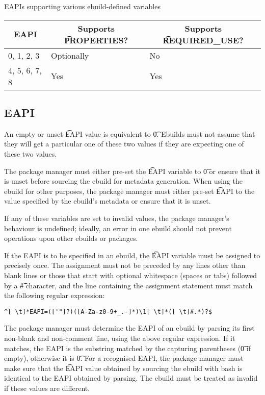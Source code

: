 \begin{centertable}{EAPIs supporting various ebuild-defined variables}
    \label{tab:optional-vars-table}
    \begin{tabular}{lll}
      \toprule
      \multicolumn{1}{c}{\textbf{EAPI}} &
      \multicolumn{1}{c}{\textbf{Supports \t{PROPERTIES}?}} &
      \multicolumn{1}{c}{\textbf{Supports \t{REQUIRED_USE}?}} \\
      \midrule
      0, 1, 2, 3        & Optionally & No  \\
      4, 5, 6, 7, 8     & Yes        & Yes \\
      \bottomrule
    \end{tabular}
\end{centertable}

\subsection{EAPI}
\label{sec:eapi}

An empty or unset \t{EAPI} value is equivalent to \t{0}. Ebuilds must not assume that they will get
a particular one of these two values if they are expecting one of these two values.

The package manager must either pre-set the \t{EAPI} variable to \t{0} or ensure that it is unset
before sourcing the ebuild for metadata generation. When using the ebuild for other purposes, the
package manager must either pre-set \t{EAPI} to the value specified by the ebuild's metadata or
ensure that it is unset.

If any of these variables are set to invalid values, the package manager's behaviour is undefined;
ideally, an error in one ebuild should not prevent operations upon other ebuilds or packages.

If the EAPI is to be specified in an ebuild, the \t{EAPI} variable must be assigned to precisely
once. The assignment must not be preceded by any lines other than blank lines or those that start
with optional whitespace (spaces or tabs) followed by a \t{\#} character, and the line containing
the assignment statement must match the following regular expression:
\begin{verbatim}
^[ \t]*EAPI=(['"]?)([A-Za-z0-9+_.-]*)\1[ \t]*([ \t]#.*)?$
\end{verbatim}

The package manager must determine the EAPI of an ebuild by parsing its first non-blank and
non-comment line, using the above regular expression. If it matches, the EAPI is the substring
matched by the capturing parentheses (\t{0} if empty), otherwise it is \t{0}. For a recognised
EAPI, the package manager must make sure that the \t{EAPI} value obtained by sourcing the ebuild
with bash is identical to the EAPI obtained by parsing. The ebuild must be treated as invalid if
these values are different.

